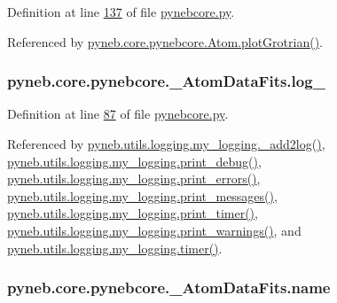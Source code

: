Definition at line \hyperlink{pynebcore_8py_source_l00137}{137} of file \hyperlink{pynebcore_8py_source}{pynebcore.\-py}.



Referenced by \hyperlink{pynebcore_8py_source_l02443}{pyneb.\-core.\-pynebcore.\-Atom.\-plot\-Grotrian()}.

\hypertarget{classpyneb_1_1core_1_1pynebcore_1_1___atom_data_fits_a8919598e2830080299dcfe70249d4a15}{
\subsubsection[{log\-\_\-}]{\setlength{\rightskip}{0pt plus 5cm}pyneb.\-core.\-pynebcore.\-\_\-\-Atom\-Data\-Fits.\-log\-\_\-}}\label{classpyneb_1_1core_1_1pynebcore_1_1___atom_data_fits_a8919598e2830080299dcfe70249d4a15}


Definition at line \hyperlink{pynebcore_8py_source_l00087}{87} of file \hyperlink{pynebcore_8py_source}{pynebcore.\-py}.



Referenced by \hyperlink{logging_8py_source_l00059}{pyneb.\-utils.\-logging.\-my\-\_\-logging.\-\_\-add2log()}, \hyperlink{logging_8py_source_l00157}{pyneb.\-utils.\-logging.\-my\-\_\-logging.\-print\-\_\-debug()}, \hyperlink{logging_8py_source_l00149}{pyneb.\-utils.\-logging.\-my\-\_\-logging.\-print\-\_\-errors()}, \hyperlink{logging_8py_source_l00133}{pyneb.\-utils.\-logging.\-my\-\_\-logging.\-print\-\_\-messages()}, \hyperlink{logging_8py_source_l00165}{pyneb.\-utils.\-logging.\-my\-\_\-logging.\-print\-\_\-timer()}, \hyperlink{logging_8py_source_l00141}{pyneb.\-utils.\-logging.\-my\-\_\-logging.\-print\-\_\-warnings()}, and \hyperlink{logging_8py_source_l00115}{pyneb.\-utils.\-logging.\-my\-\_\-logging.\-timer()}.

\hypertarget{classpyneb_1_1core_1_1pynebcore_1_1___atom_data_fits_ac3d861a23f94412d8ae28aeb15a98170}{
\subsubsection[{name}]{\setlength{\rightskip}{0pt plus 5cm}pyneb.\-core.\-pynebcore.\-\_\-\-Atom\-Data\-Fits.\-name}}\label{classpyneb_1_1core_1_1pynebcore_1_1___atom_data_fits_ac3d861a23f94412d8ae28aeb15a98170}


